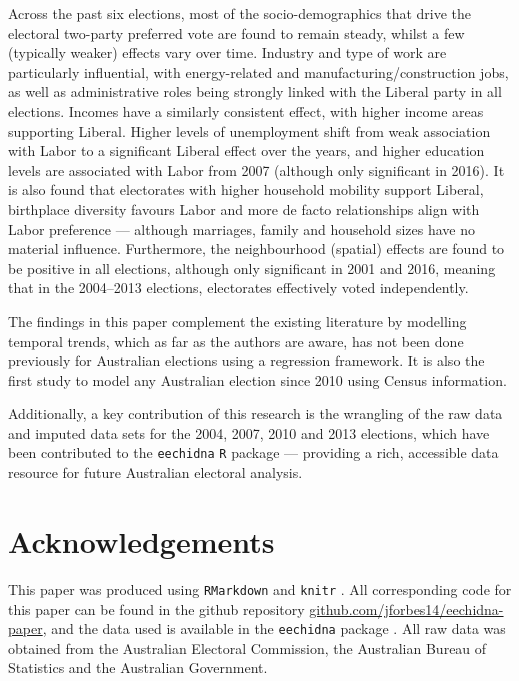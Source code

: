 \documentclass[11pt,a4paper,]{article}
\begin{document}
Across the past six elections, most of the socio-demographics that drive the electoral two-party preferred vote are found to remain steady, whilst a few (typically weaker) effects vary over time. Industry and type of work are particularly influential, with energy-related and manufacturing/construction jobs, as well as administrative roles being strongly linked with the Liberal party in all elections. Incomes have a similarly consistent effect, with higher income areas supporting Liberal. Higher levels of unemployment shift from weak association with Labor to a significant Liberal effect over the years, and higher education levels are associated with Labor from 2007 (although only significant in 2016). It is also found that electorates with higher household mobility support Liberal, birthplace diversity favours Labor and more de facto relationships align with Labor preference --- although marriages, family and household sizes have no material influence. Furthermore, the neighbourhood (spatial) effects are found to be positive in all elections, although only significant in 2001 and 2016, meaning that in the 2004--2013 elections, electorates effectively voted independently.

The findings in this paper complement the existing literature by modelling temporal trends, which as far as the authors are aware, has not been done previously for Australian elections using a regression framework. It is also the first study to model any Australian election since 2010 using Census information.

Additionally, a key contribution of this research is the wrangling of the raw data and imputed data sets for the 2004, 2007, 2010 and 2013 elections, which have been contributed to the \texttt{eechidna} \texttt{R} package --- providing a rich, accessible data resource for future Australian electoral analysis.

\hypertarget{acknowledgements}{%
\section{Acknowledgements}\label{acknowledgements}}

This paper was produced using \texttt{RMarkdown} \autocite{rmarkdown} and \texttt{knitr} \autocite{knitr}. All corresponding code for this paper can be found in the github repository \href{https://github.com/jforbes14/eechidna-paper}{github.com/jforbes14/eechidna-paper}, and the data used is available in the \texttt{eechidna} package \autocite{eechidna}. All raw data was obtained from the Australian Electoral Commission, the Australian Bureau of Statistics and the Australian Government.
\end{document}
